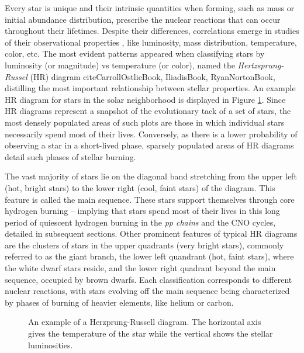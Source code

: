 Every star is unique and their intrinsic quantities when forming, such as mass or initial abundance distribution, prescribe the nuclear reactions that can occur throughout their lifetimes. Despite their differences, correlations emerge in studies of their observational properties , like luminosity, mass distribution, temperature, color, etc. The most evident patterns appeared when classifying stars by luminosity (or magnitude) vs temperature (or color), named the \textit{Hertzsprung-Russel} (HR) diagram cite{CarrollOstlieBook, IliadisBook, RyanNortonBook}, distilling the most important relationship between stellar properties. An example HR diagram for stars in the solar neighborhood is displayed in Figure \ref{fig: HR_diagram}. Since HR diagrams represent a snapshot of the evolutionary tack of a set of stars, the most densely populated areas of such plots are those in which individual stars necessarily spend most of their lives. Conversely, as there is a lower probability of observing a star in a short-lived phase, sparsely populated areas of HR diagrams detail such phases of stellar burning. 

The vast majority of stars lie on the diagonal band stretching from the upper left (hot, bright stars) to the lower right (cool, faint stars) of the diagram. This feature is called the main sequence. These stars support themselves through core hydrogen burning -- implying that stars spend most of their lives in this long period of quiescent hydrogen burning in the \textit{pp chains} and the CNO cycles, detailed in subsequent sections. Other prominent features of typical HR diagrams are the clusters of stars in the upper quadrants (very bright stars), commonly referred to as the giant branch, the lower left quandrant (hot, faint stars), where the white dwarf stars reside, and the lower right quadrant beyond the main sequence, occupied by brown dwarfs. Each classification corresponds to different nuclear reactions, with stars evolving off the main sequence being characterized by phases of burning of heavier elements, like helium or carbon. 

\begin{figure}
\label{fig: HR_diagram}
\caption{An example of a Herzprung-Russell diagram. The horizontal axis gives the temperature of the star while the vertical shows the stellar luminosities.}
\end{figure}

